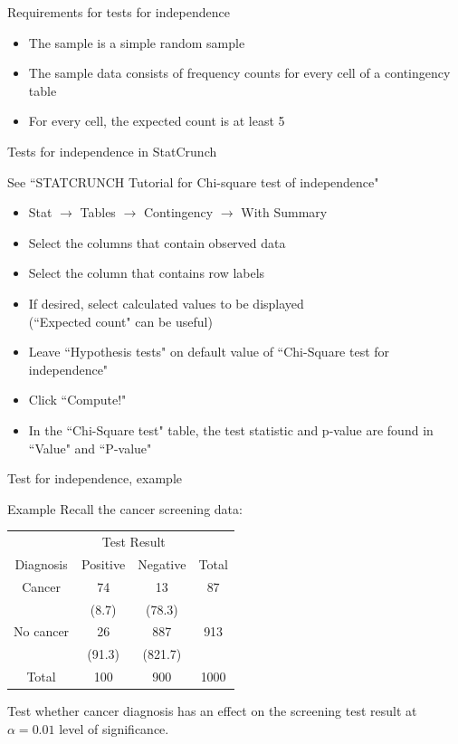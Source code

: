 \documentclass[xcolor=table, handout]{beamer}
\begin{document}
\begin{frame}{Requirements for tests for independence}
\begin{block}{}
\large
\begin{itemize}
\item The sample is a simple random sample
\pause\item The sample data consists of frequency counts for every cell of a contingency table
\pause\item For every cell, the expected count is at least 5 
\end{itemize}
\end{block}
\end{frame}

\begin{frame}{Tests for independence in StatCrunch}
\begin{alertblock}{}
See ``STATCRUNCH Tutorial for Chi-square test of independence"
\end{alertblock}

\begin{block}{}
\begin{itemize}
\item Stat $\to$ Tables $\to$ Contingency $\to$ With Summary
\item Select the columns that contain observed data
\item Select the column that contains row labels
\item If desired, select calculated values to be displayed\\(``Expected count" can be useful)
\item Leave ``Hypothesis tests" on default value of ``Chi-Square test for independence"
\item Click ``Compute!"
\item In the ``Chi-Square test" table, the test statistic and p-value are found in ``Value" and ``P-value"
\end{itemize}
\end{block}

\end{frame}

\begin{frame}{Test for independence, example}
\begin{exampleblock}{Example}
Recall the cancer screening data:\\
\smallskip
{\centering
\begin{tabular}{c | c  c | c}
\multicolumn{1}{c}{} & \multicolumn{2}{c}{Test Result}\\
Diagnosis & Positive & Negative & Total\\
\hline
Cancer & 74 & 13 & 87\\
& (8.7) & (78.3)\\
No cancer & 26 & 887 & 913 \\
& (91.3) & (821.7)\\
\hline
Total & 100 & 900 & 1000
\end{tabular}
\par}
\bigskip
Test whether cancer diagnosis has an effect on the screening test result at $\alpha = 0.01$ level of significance.
\end{exampleblock}
\end{frame}
\end{document}
